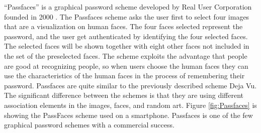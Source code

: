     \begin{figure}[H]
      \centering
    \end{figure}  

  ``Passfaces'' is a graphical password scheme developed by Real User Corporation founded in 2000 \cite{passface}. The Passfaces scheme asks the user first to select four images that are a visualization on human faces. The four faces selected represent the password, and the user get authenticated by identifying the four selected faces. The selected faces will be shown together with eight other faces not included in the set of the preselected faces. The scheme exploits the advantage that people are good at recognizing people, so when users choose the human faces they can use the characteristics of the human faces in the process of remembering their password. Passfaces are quite similar to the previously described scheme Deja Vu. The significant difference between the schemes is that they are using different association elements in the images, faces, and random art. Figure \ref{fig:Passfaces} is showing the PassFaces scheme used on a smartphone. Passfaces is one of the few graphical password schemes with a commercial success. 

